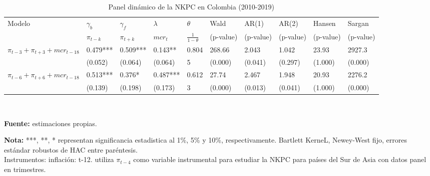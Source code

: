\begin{table}[H]
\centering
\caption{Panel dinámico de la NKPC en Colombia (2010-2019)}
\resizebox{15cm}{!} {
  \begin{tabular}{ p{3cm} p{1.2cm} p{1.2cm} p{1.5cm} p{1.2cm} p{1.2cm} p{1.2cm} p{1.2cm} p{1.2cm} p{1.2cm}}
  \hline
  Modelo  & $\gamma_{b}$  & $\gamma_{f}$ & $\lambda$   & $\theta$ &  Wald  &  AR(1)  &  AR(2)  & Hansen &  Sargan   \\
  &        $\pi_{t-k}$    &    $\pi_{t+k}$    &   $mcr_{t}$    &   $\frac{1}{1-\theta}$    &  \scriptsize{(p-value)}  &  \scriptsize{(p-value)}  &  \scriptsize{(p-value)}  & \scriptsize{(p-value)} &  \scriptsize{(p-value)}   \\
   \hline
    \hline
   \scriptsize{$\pi_{t-3}+\pi_{t+3}+mcr_{t-18}$} & 0.479*** & 0.509*** & 0.143** &  0.804  &   268.66  &  2.043  &  1.042  &  23.93 &  2927.3    \\
  & \scriptsize{(0.052)} & \scriptsize{(0.064)} & \scriptsize{(0.064)} & \scriptsize{5}     & \scriptsize{(0.000)} & \scriptsize{(0.041)} & \scriptsize{(0.297)} & \scriptsize{(1.000)} & \scriptsize{(0.000)} \\
   \scriptsize{$\pi_{t-6}+\pi_{t+6}+mcr_{t-18}$} & 0.513*** & 0.376* & 0.487*** &  0.612  &   27.74  &  2.467  &  1.948  & 20.93 &  2276.2   \\
  & \scriptsize{(0.139)} & \scriptsize{(0.198)} & \scriptsize{(0.173)} &  \scriptsize{3}    & \scriptsize{(0.000)} & \scriptsize{(0.013)} & \scriptsize{(0.041)} & \scriptsize{(1.000)} & \scriptsize{(0.000)} \\
   \hline
  \end{tabular}%
}
\label{panel}\\
  \raggedright  \scriptsize \textbf{Fuente:} estimaciones propias. \\
\raggedright  \scriptsize \textbf{Nota:} ***,  **, * representan significancia estadistica al 1\%, 5\% y 10\%, respectivamente. Bartlett KerneL, Newey-West fijo, errores estándar robustos de HAC entre paréntesis.\\
Instrumentos: inflación: t-12. \cite{wardhonoestimated}  utiliza  $\pi_{t-4}$ como variable instrumental para estudiar la NKPC para países del Sur de Asia con datos panel en trimestres.\\
\end{table}%


